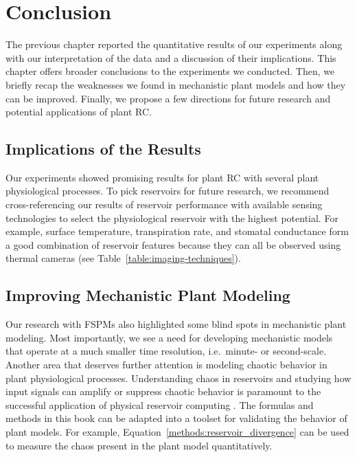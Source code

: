 
\chapter{Conclusion} \label{chapter:discussion}

The previous chapter reported the quantitative results of our experiments along with our interpretation of the data and a discussion of their implications.
This chapter offers broader conclusions to the experiments we conducted.
Then, we briefly recap the weaknesses we found in mechanistic plant models and how they can be improved.
Finally, we propose a few directions for future research and potential applications of plant RC.


\section{Implications of the Results}

Our experiments showed promising results for plant RC with several plant physiological processes.
To pick reservoirs for future research, we recommend cross-referencing our results of reservoir performance with available sensing technologies to select the physiological reservoir with the highest potential.
For example, surface temperature, transpiration rate, and stomatal conductance form a good combination of reservoir features because they can all be observed using thermal cameras (see \mbox{Table \ref{table:imaging-techniques}}).


\section{Improving Mechanistic Plant Modeling}

Our research with FSPMs also highlighted some blind spots in mechanistic plant modeling.
Most importantly, we see a need for developing mechanistic models that operate at a much smaller time resolution, i.e.\ minute- or second-scale.
Another area that deserves further attention is modeling chaotic behavior in plant physiological processes.
Understanding chaos in reservoirs and studying how input signals can amplify or suppress chaotic behavior is paramount to the successful application of physical reservoir computing \citep{nakajima_physical_2020}.
The formulas and methods in this book can be adapted into a toolset for validating the behavior of plant models.
For example, \mbox{Equation \ref{methods:reservoir_divergence}} can be used to measure the chaos present in the plant model quantitatively.  


